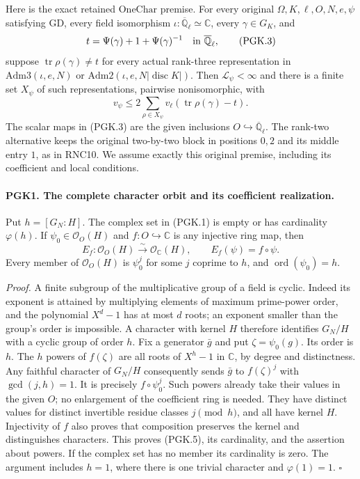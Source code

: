 Here is the exact retained \(\mathrm{OneChar}\) premise. For
every original \(\Omega,K,\ell,O,N,e,\psi\) satisfying
\(\mathrm{GD}\), every field isomorphism
\(\iota:\overline{\mathbb Q}_\ell\simeq\mathbb C\), every
\(\gamma\in G_K\), and
\[
 t=\Psi(\gamma)+1+\Psi(\gamma)^{-1}
                  \quad\hbox{in }\overline{\mathbb Q}_\ell,
 \tag{PGK.3}
\]
suppose \(\operatorname{tr}\rho(\gamma)\ne t\) for every actual
rank-three representation in
\(\mathrm{Adm3}(\iota,e,N)\) or
\(\mathrm{Adm2}(\iota,e,N|\operatorname{disc}K|)\).
Then \(\mathcal L_\psi<\infty\) and there is a finite set
\(X_\psi\) of such representations, pairwise nonisomorphic, with
\[
 v_\psi\le2\sum_{\rho\in X_\psi}
             v_\ell(\operatorname{tr}\rho(\gamma)-t).
 \tag{PGK.4}
\]
The scalar maps in (PGK.3) are the given inclusions
\(O\hookrightarrow\overline{\mathbb Q}_\ell\). The rank-two
alternative keeps the original two-by-two block in positions
\(0,2\) and its middle entry \(1\), as in RNC10. We assume exactly
this original premise, including its coefficient and local conditions.

\paragraph{PGK1. The complete character orbit and its coefficient realization.}
\label{claim:PGK1}
Put \(h=[G_N:H]\). The complex set in (PGK.1) is empty or has
cardinality \(\varphi(h)\). If \(\psi_0\in\mathcal O_O(H)\) and
\(f:O\hookrightarrow\mathbb C\) is any injective ring map, then
\[
 E_f:\mathcal O_O(H)\overset\sim\longrightarrow
       \mathcal O_{\mathbb C}(H),\qquad
                     E_f(\psi)=f\circ\psi .                    \tag{PGK.5}
\]
Every member of \(\mathcal O_O(H)\) is \(\psi_0^j\) for some
\(j\) coprime to \(h\), and \(\operatorname{ord}(\psi_0)=h\).

\emph{Proof.}
A finite subgroup of the multiplicative group of a field is cyclic.
Indeed its exponent is attained by multiplying elements of maximum
prime-power order, and the polynomial \(X^d-1\) has at most \(d\)
roots; an exponent smaller than the group's order is impossible.
A character with kernel \(H\) therefore identifies \(G_N/H\)
with a cyclic group of order \(h\). Fix a generator \(\bar g\)
and put \(\zeta=\psi_0(g)\). Its order is \(h\).
The \(h\) powers of \(f(\zeta)\) are all roots of \(X^h-1\)
in \(\mathbb C\), by degree and distinctness. Any faithful
character of \(G_N/H\) consequently sends \(\bar g\) to
\(f(\zeta)^j\) with \(\gcd(j,h)=1\). It is precisely
\(f\circ\psi_0^j\). Such powers already take their values in
the given \(O\); no enlargement of the coefficient ring is needed.
They have distinct values for distinct invertible residue classes
\(j\pmod h\), and all have kernel \(H\).
Injectivity of \(f\) also proves that composition preserves the
kernel and distinguishes characters. This proves (PGK.5), its
cardinality, and the assertion about powers. If the complex set
has no member its cardinality is zero. The argument includes
\(h=1\), where there is one trivial character and
\(\varphi(1)=1\). \hfill\(\square\)

